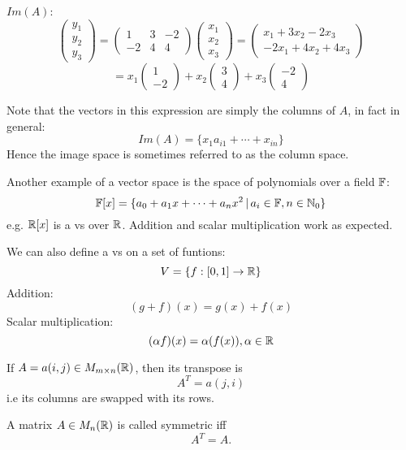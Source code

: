 \documentclass[a4paper,10pt]{article}
\begin{document}
\begin{ex}
	$Im(A)$:
	\[
		\begin{pmatrix}
			y_1 \\
			y_2 \\
			y_3
		\end{pmatrix}
		=
		\begin{pmatrix}
			1  & 3 & -2 \\
			-2 & 4 & 4
		\end{pmatrix}
		\begin{pmatrix}
			x_1 \\
			x_2 \\
			x_3
		\end{pmatrix}
		=
		\begin{pmatrix}
			x_1   + 3x_2 - 2x_3  \\
			-2x_1 + 4x_2 + 4x_3
		\end{pmatrix}
	\]
	\[
		= x_1
		\begin{pmatrix}
			1 \\
			-2
		\end{pmatrix}
		+ x_2
		\begin{pmatrix}
			3 \\
			4
		\end{pmatrix}
		+ x_3
		\begin{pmatrix}
			-2 \\
			4
		\end{pmatrix}
	\]

	Note that the vectors in this expression are simply the columns of $A$, in fact in general:
	\[ Im(A) = \{x_1a_{i1} + \cdots + x_{in}\} \]
	Hence the image space is sometimes referred to as the column space.
\end{ex}

Another example of a vector space is the space of polynomials over a field $\mathbb{F}$:
\[
	\mathbb{F}[x] =
	\{a_0 + a_1 x + \cdots + a_n x^2 \, | \, a_i \in \mathbb{F}, n \in \mathbb{N}_0\}
\]
e.g. $\mathbb{R}[x]$ is a vs over $\mathbb{R}$.
Addition and scalar multiplication work as expected.

We can also define a vs on a set of funtions:
\[
	V = \{f:[0,1] \to \mathbb{R}\}
\]
Addition:
\[
	(g+f)(x) = g(x) + f(x)
\]
Scalar multiplication:
\[
	(\alpha f)(x) = \alpha (f(x)), \alpha \in \mathbb{R}
\]


\begin{defn}[Transpose]
	If $A = a(i,j) \in M_{m \times n}(\mathbb{R})$, then its transpose is
	\[ A^T = a(j,i) \]
	i.e its columns are swapped with its rows.
\end{defn}
\begin{defn}[Symmetric]
	A matrix $A \in M_{n}(\mathbb{R})$ is called symmetric iff
	\[ A^T = A. \]
\end{defn}
\end{document}
